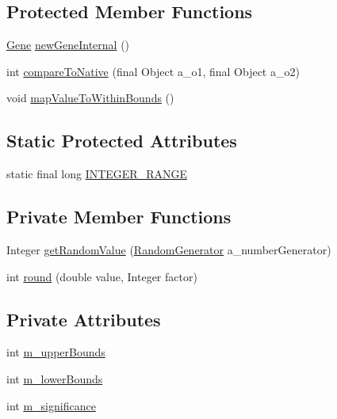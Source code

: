 \subsection*{Protected Member Functions}
\begin{DoxyCompactItemize}
\item 
\hyperlink{interfaceorg_1_1jgap_1_1_gene}{Gene} \hyperlink{classorg_1_1jgap_1_1impl_1_1_mutiple_integer_gene_a0d94e1fe37cbc3e7cda6481117f2a45a}{new\-Gene\-Internal} ()
\item 
int \hyperlink{classorg_1_1jgap_1_1impl_1_1_mutiple_integer_gene_ad20a890d57854b4fc48f53e0062bafcd}{compare\-To\-Native} (final Object a\-\_\-o1, final Object a\-\_\-o2)
\item 
void \hyperlink{classorg_1_1jgap_1_1impl_1_1_mutiple_integer_gene_a40e4284a0f01a3847ea8a639e568f0c5}{map\-Value\-To\-Within\-Bounds} ()
\end{DoxyCompactItemize}
\subsection*{Static Protected Attributes}
\begin{DoxyCompactItemize}
\item 
static final long \hyperlink{classorg_1_1jgap_1_1impl_1_1_mutiple_integer_gene_a3d4df735f37d9af1cbc88febb02fafd4}{I\-N\-T\-E\-G\-E\-R\-\_\-\-R\-A\-N\-G\-E}
\end{DoxyCompactItemize}
\subsection*{Private Member Functions}
\begin{DoxyCompactItemize}
\item 
Integer \hyperlink{classorg_1_1jgap_1_1impl_1_1_mutiple_integer_gene_a8574d37804fc08ca00f64e16c2714ee6}{get\-Random\-Value} (\hyperlink{interfaceorg_1_1jgap_1_1_random_generator}{Random\-Generator} a\-\_\-number\-Generator)
\item 
int \hyperlink{classorg_1_1jgap_1_1impl_1_1_mutiple_integer_gene_a869e8a665636aaf48731699377a02fc7}{round} (double value, Integer factor)
\end{DoxyCompactItemize}
\subsection*{Private Attributes}
\begin{DoxyCompactItemize}
\item 
int \hyperlink{classorg_1_1jgap_1_1impl_1_1_mutiple_integer_gene_a7bd98488d96667540c92755045ad9460}{m\-\_\-upper\-Bounds}
\item 
int \hyperlink{classorg_1_1jgap_1_1impl_1_1_mutiple_integer_gene_a7b45efab7e7616c0500aa75a91b5bb5e}{m\-\_\-lower\-Bounds}
\item 
int \hyperlink{classorg_1_1jgap_1_1impl_1_1_mutiple_integer_gene_a1141637eb3370afa0aa721074a4c129b}{m\-\_\-significance}
\end{DoxyCompactItemize}
